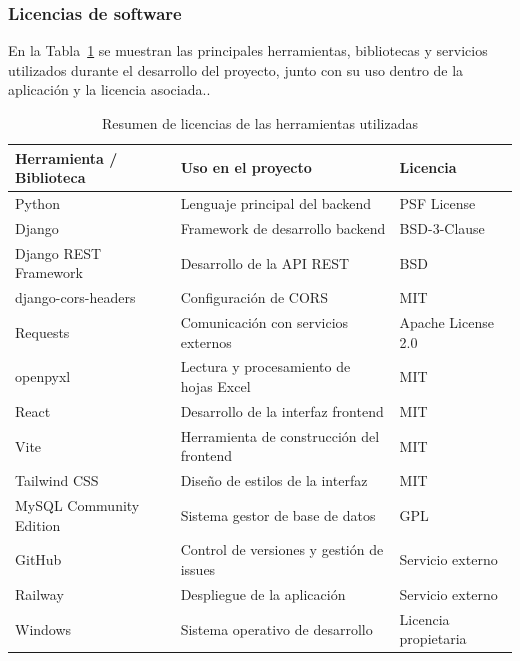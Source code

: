 \subsubsection{Licencias de software}

En la Tabla~\ref{tab:licencias} se muestran las principales herramientas, bibliotecas y servicios utilizados durante el desarrollo del proyecto, junto con su uso dentro de la aplicación y la licencia asociada.\cite{pythonLicense,djangoLicense,drfLicense,reactLicense,viteLicense,tailwindLicense,mysqlLicense,openpyxlLicense,corsHeadersLicense,windowsLicense}.

\begin{table}[H]
	\centering
	\small
	\setlength{\tabcolsep}{4pt}
	\renewcommand{\arraystretch}{1.2}
	\begin{tabularx}{\textwidth}{@{}
			>{\raggedright\arraybackslash}p{3.2cm}
			>{\raggedright\arraybackslash}X
			>{\raggedright\arraybackslash}p{3cm}
			@{}}
		\toprule
		\textbf{Herramienta / Biblioteca} & \textbf{Uso en el proyecto} & \textbf{Licencia} \\
		\midrule
		Python & Lenguaje principal del backend & PSF License \\
		Django & Framework de desarrollo backend & BSD-3-Clause \\
		Django REST Framework & Desarrollo de la API REST & BSD \\
		django-cors-headers & Configuración de CORS & MIT \\
		Requests & Comunicación con servicios externos & Apache License 2.0 \\
		openpyxl & Lectura y procesamiento de hojas Excel & MIT \\
		React & Desarrollo de la interfaz frontend & MIT \\
		Vite & Herramienta de construcción del frontend & MIT \\
		Tailwind CSS & Diseño de estilos de la interfaz & MIT \\
		MySQL Community Edition & Sistema gestor de base de datos & GPL \\
		GitHub & Control de versiones y gestión de issues & Servicio externo \\
		Railway & Despliegue de la aplicación & Servicio externo \\
		Windows & Sistema operativo de desarrollo & Licencia propietaria \\
		\bottomrule
	\end{tabularx}
	\caption{Resumen de licencias de las herramientas utilizadas}
	\label{tab:licencias}
\end{table}


